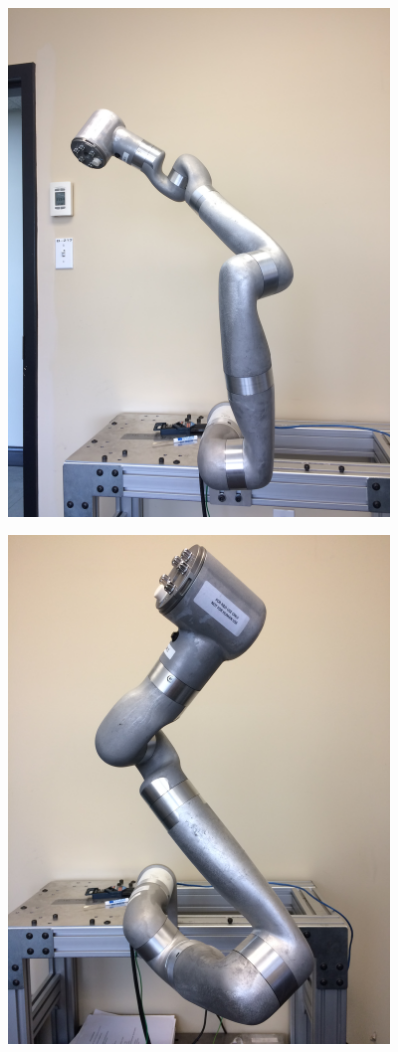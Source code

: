\begin{figure}
	\centering
	\begin{minipage}{.5\textwidth}
		\centering
		\includegraphics[width=0.9\textwidth]{./images/Pose5}
		\label{fig:pose5}
	\end{minipage}%
	\begin{minipage}{.5\textwidth}
		\centering
		\includegraphics[width=0.9\textwidth]{./images/Pose6}

\end{minipage}
\end{figure}
